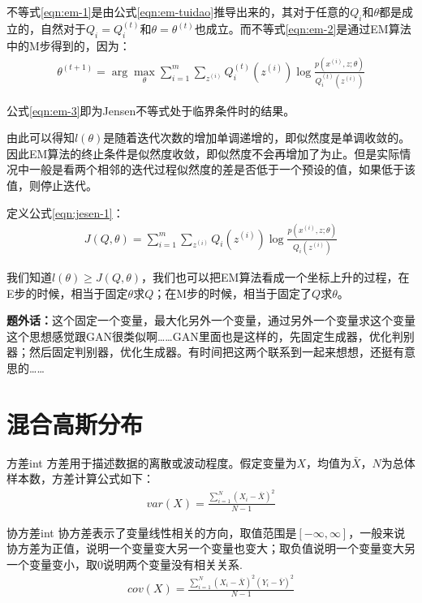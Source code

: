 不等式\ref{eqn:em-1}是由公式\ref{eqn:em-tuidao}推导出来的，其对于任意的$Q_{i}$和$\theta$都是成立的，自然对于$Q_{i}=Q_{i}^{(t)}$和$\theta=\theta^{(t)}$也成立。而不等式\ref{eqn:em-2}是通过EM算法中的M步得到的，因为：
\begin{align}
  \theta^{(t+1)} = \arg\mathop{\max}_{\theta} \sum_{i=1}^{m} \sum_{z^{(i)}}  Q_{i}^{(t)}(z^{(i)}) \log \frac{p(x^{(i)}, z;\theta)}{Q_{i}^{(t)}(z^{(i)})}
\end{align}  

公式\ref{eqn:em-3}即为Jensen不等式处于临界条件时的结果。

由此可以得知$l(\theta)$是随着迭代次数的增加单调递增的，即似然度是单调收敛的。因此EM算法的终止条件是似然度收敛，即似然度不会再增加了为止。但是实际情况中一般是看两个相邻的迭代过程似然度的差是否低于一个预设的值，如果低于该值，则停止迭代。

定义公式\ref{eqn:jesen-1}：
\begin{align}
\label{eqn:jesen-1}
  J(Q,\theta) = \sum_{i=1}^{m} \sum_{z^{(i)}}  Q_{i}(z^{(i)}) \log \frac{p(x^{(i)}, z;\theta)}{Q_{i}(z^{(i)})}
\end{align}

我们知道$l(\theta) \geq J(Q,\theta)$，我们也可以把EM算法看成一个坐标上升的过程，在E步的时候，相当于固定$\theta$求$Q$；在M步的时候，相当于固定了$Q$求$\theta$。

{\bf 题外话：}这个固定一个变量，最大化另外一个变量，通过另外一个变量求这个变量这个思想感觉跟GAN很类似啊……GAN里面也是这样的，先固定生成器，优化判别器；然后固定判别器，优化生成器。有时间把这两个联系到一起来想想，还挺有意思的……
\section{混合高斯分布}

\begin{definition}{方差}{int}
方差用于描述数据的离散或波动程度。假定变量为$X$，均值为$\bar{X}$，$N$为总体样本数，方差计算公式如下：
\begin{align}
var(X) = \frac{\sum_{i=1}^{N}(X_i-\bar{X})^{2}}{N-1}
\end{align}
\end{definition}

\begin{definition}{协方差}{int}
协方差表示了变量线性相关的方向，取值范围是$[-\infty, \infty]$，一般来说协方差为正值，说明一个变量变大另一个变量也变大；取负值说明一个变量变大另一个变量变小，取0说明两个变量没有相关关系.
\begin{align}
cov(X) = \frac{\sum_{i=1}^{N}(X_i-\bar{X})^{2}(Y_i-\bar{Y})^{2}}{N-1}
\end{align}
\end{definition}

